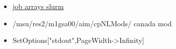 \documentclass[hyperref]{labbook}
\begin{document}

\begin{itemize}
\item \href{someParallel-node001a.6990135simple.out}{job arrays slurm}
\end{itemize}


\begin{itemize}
\item /msu/res2/m1gsa00/aim/cpNLMods/  canada mod
\item SetOptions["stdout",PageWidth->Infinity]
\end{itemize}

\begin{verbatim}



\end{verbatim}
\end{document}
